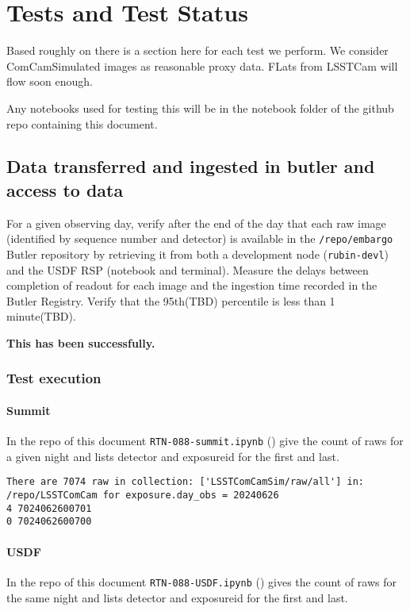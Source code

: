 \section{Tests and Test Status} \label{sec:testing}
Based roughly on  there is a section here for each test we perform.
We consider ComCamSimulated images as reasonable proxy data.
FLats from LSSTCam will flow soon enough.

Any notebooks used for testing this will be in the notebook folder of the github repo containing this document.

\subsection{Data transferred and ingested in butler and access to data}
For a given observing day, verify after the end of the day that each raw image (identified by sequence number and detector) is available in the \texttt{/repo/embargo} Butler repository by retrieving it from both a development node (\texttt{rubin-devl}) and the USDF RSP (notebook and terminal).
Measure the delays between completion of readout for each image and the ingestion time recorded in the Butler Registry.
Verify that the 95th(TBD) percentile is less than 1 minute(TBD).

\textbf{This has been successfully.}

\subsubsection{Test execution}
\paragraph{Summit}
In the repo of this document \texttt{RTN-088-summit.ipynb} () give the count of raws for a given night and lists detector and exposureid for the first and last.

\begin{lstlisting}
There are 7074 raw in collection: ['LSSTComCamSim/raw/all'] in: /repo/LSSTComCam for exposure.day_obs = 20240626
4 7024062600701
0 7024062600700
\end{lstlisting}

\paragraph{USDF}
In the repo of this document \texttt{RTN-088-USDF.ipynb} () gives the count of raws for the same night and lists detector and exposureid for the first and last.

